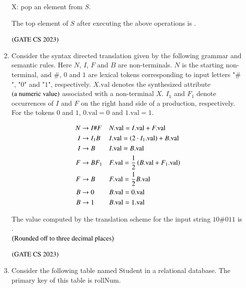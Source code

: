 \documentclass[journal,12pt,onecolumn]{IEEEtran}
\theoremstyle{remark}
\begin{document}
\begin{enumerate}
			X: pop an element from $S$.
			
			The top element of $S$ after executing the above operations is \underline{\hspace{2cm}}.
			
			\hfill $\left(\text{GATE CS 2023}\right)$
			
			\item Consider the syntax directed translation given by the following grammar and semantic rules. Here $N$, $I$, $F$ and $B$ are non-terminals. $N$ is the starting non-terminal, and $\#$, $0$ and $1$ are lexical tokens corresponding to input letters "$\#$", "$0$" and "$1$", respectively. $X.\text{val}$ denotes the synthesized attribute $\left(\text{a numeric value}\right)$ associated with a non-terminal $X$. $I_1$ and $F_1$ denote occurrences of $I$ and $F$ on the right hand side of a production, respectively. For the tokens $0$ and $1$, $0.\text{val} = 0$ and $1.\text{val} = 1$.
			
			\begin{align*}
				N &\to I \# F &&N.\text{val} = I.\text{val} + F.\text{val}\\
				I &\to I_1 B &&I.\text{val} = \left(2 \cdot I_1.\text{val}\right) + B.\text{val}\\
				I &\to B &&I.\text{val} = B.\text{val}\\
				F &\to B F_1 &&F.\text{val} = \frac{1}{2}\left(B.\text{val} + F_1.\text{val}\right)\\
				F &\to B &&F.\text{val} = \frac{1}{2}B.\text{val}\\
				B &\to 0 &&B.\text{val} = 0.\text{val}\\
				B &\to 1 &&B.\text{val} = 1.\text{val}
			\end{align*}
			
			The value computed by the translation scheme for the input string $10\#011$ is \underline{\hspace{2cm}}.\\
			 $\left(\text{Rounded off to three decimal places}\right)$
			
			\hfill $\left(\text{GATE CS 2023}\right)$
			
			\item Consider the following table named Student in a relational database. The primary key of this table is rollNum.
			

\end{enumerate}
\end{document}
